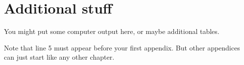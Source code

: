 \documentclass{monashthesis}
\begin{document}
\appendix

\hypertarget{additional-stuff}{%
\chapter{Additional stuff}\label{additional-stuff}}

You might put some computer output here, or maybe additional tables.

Note that line 5 must appear before your first appendix. But other appendices can just start like any other chapter.

\printbibliography[heading=bibintoc]
\end{document}
